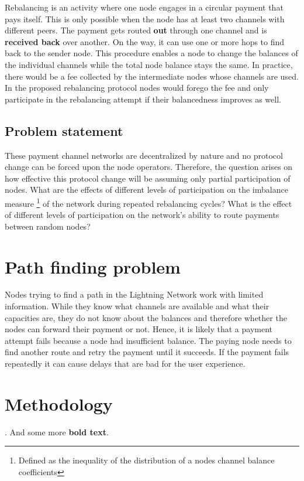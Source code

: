 \documentclass[final]{fhnwreport}       %
\begin{document}
Rebalancing is an activity where one node engages in a circular payment that pays itself. This is only possible when the node has at least two channels with different peers. The payment gets routed \textbf{out} through one channel and is \textbf{received back} over another. On the way, it can use one or more hops to find back to the sender node. This procedure enables a node to change the balances of the individual channels while the total node balance stays the same. In practice, there would be a fee collected by the intermediate nodes whose channels are used. In the proposed rebalancing protocol nodes would forego the fee and only participate in the rebalancing attempt if their balancedness improves as well.

\subsection{Problem statement}
These payment channel networks are decentralized by nature and no protocol change can be forced upon the node operators. Therefore, the question arises on how effective this protocol change will be assuming only partial participation of nodes. What are the effects of different levels of participation on the imbalance measure \footnote{Defined as the inequality of the distribution of a nodes channel balance coefficients} of the network during repeated rebalancing cycles? What is the effect of different levels of participation on the network's ability to route payments between random nodes? 


\section{Path finding problem}

Nodes trying to find a path in the Lightning Network work with limited information. While they know what channels are available and what their capacities are, they do not know about the balances and therefore whether the nodes can forward their payment or not. Hence, it is likely that a payment attempt fails because a node had insufficient balance. The paying node needs to find another route and retry the payment until it succeeds. If the payment fails repeatedly it can cause delays that are bad for the user experience. 

\section{Methodology} \label{sec:method}
. And some more \textbf{bold text}.
\end{document}
